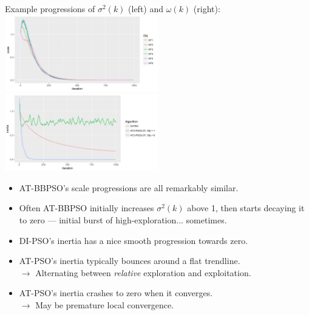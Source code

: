 \documentclass[xcolor=dvipsnames]{beamer}
\begin{document}
\begin{frame}
Example progressions of $\sigma^2(k)$ (left) and $\omega(k)$ (right):
\includegraphics[width = 0.5\textwidth]{../doc/scaleplot.png}
\includegraphics[width = 0.5\textwidth]{../doc/inertiaplot.png}
\pause
\begin{itemize}
\item  AT-BBPSO's scale progressions are all remarkably similar.\pause
\item  Often AT-BBPSO initially increases $\sigma^2(k)$ above 1, then starts decaying it to zero --- initial burst of high-exploration... sometimes.\pause
\item  DI-PSO's inertia has a nice smooth progression towards zero. \pause
\item  AT-PSO's inertia typically bounces around a flat trendline.\\
$\to$ Alternating between \emph{relative} exploration and exploitation. \pause
\item  AT-PSO's inertia crashes to zero when it converges. \\
$\to$ May be premature local convergence.
\end{itemize}
\end{frame}
\end{document}
